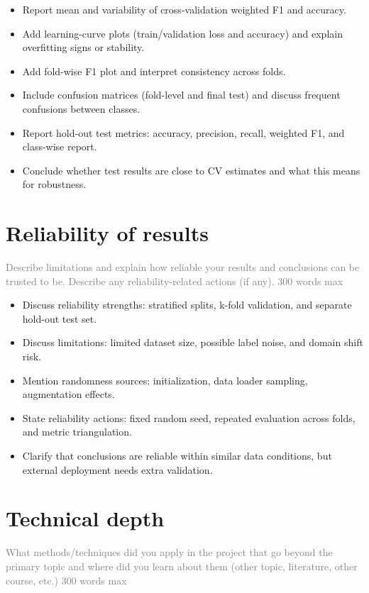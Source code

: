 \documentclass{article}
\begin{document}
\begin{itemize}
    \item Report mean and variability of cross-validation weighted F1 and accuracy.
    \item Add learning-curve plots (train/validation loss and accuracy) and explain overfitting signs or stability.
    \item Add fold-wise F1 plot and interpret consistency across folds.
    \item Include confusion matrices (fold-level and final test) and discuss frequent confusions between classes.
    \item Report hold-out test metrics: accuracy, precision, recall, weighted F1, and class-wise report.
    \item Conclude whether test results are close to CV estimates and what this means for robustness.
\end{itemize}

\section{Reliability of results}
\textcolor{gray}{Describe limitations and explain how reliable your results and conclusions can be trusted to be. Describe any reliability-related actions (if any). 300 words max}

\begin{itemize}
    \item Discuss reliability strengths: stratified splits, k-fold validation, and separate hold-out test set.
    \item Discuss limitations: limited dataset size, possible label noise, and domain shift risk.
    \item Mention randomness sources: initialization, data loader sampling, augmentation effects.
    \item State reliability actions: fixed random seed, repeated evaluation across folds, and metric triangulation.
    \item Clarify that conclusions are reliable within similar data conditions, but external deployment needs extra validation.
\end{itemize}

\section{Technical depth}
\textcolor{gray}{What methods/techniques did you apply in the project that go beyond the primary topic and where did you learn about them (other topic, literature, other course, etc.) 300 words max}
\end{document}
